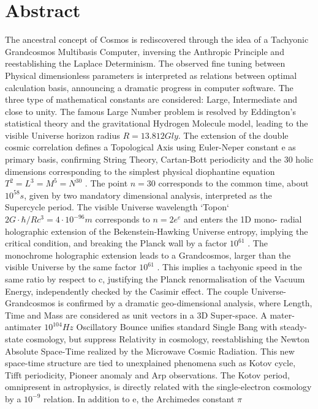
\chapter*{Abstract}
\vspace{-40pt}
The ancestral concept of Cosmos is rediscovered through the idea of a Tachyonic
Grandcosmos Multibasis Computer, inversing the Anthropic Principle and reestablishing
the Laplace Determinism. The observed fine tuning between Physical dimensionless
parameters is interpreted as relations between optimal calculation basis, announcing a
dramatic progress in computer software. The three type of mathematical constants are
considered: Large, Intermediate and close to unity. The famous Large Number problem is
resolved by Eddington's statistical theory and the gravitational Hydrogen Molecule model,
leading to the visible Universe horizon radius $ R = 13.812 Gly $. The extension of
the double cosmic correlation defines a Topological Axis using Euler-Neper constant e as
primary basis, confirming String Theory, Cartan-Bott periodicity and the 30 holic
dimensions corresponding to the simplest physical diophantine equation $T^2 = L^3 = M^5 =
N^{30}$ . The point $n = 30$ corresponds to the common time, about $10^{58} s$, given by two
mandatory dimensional analysis, interpreted as the Supercycle period. The visible Universe
wavelength `Topon` $2G \cdot \hbar / Rc^3 = 4 \cdot 10^{-96} m$ corresponds to $n = 2e^e$ and enters the 1D mono-
radial holographic extension of the Bekenstein-Hawking Universe entropy, implying the
critical condition, and breaking the Planck wall by a factor $10^{61}$ . The monochrome
holographic extension leads to a Grandcosmos, larger than the visible Universe by the
same factor $10^{61}$ . This implies a tachyonic speed in the same ratio by respect to c, justifying
the Planck renormalisation of the Vacuum Energy, independently checked by the Casimir
effect. The couple Universe-Grandcosmos is confirmed by a dramatic geo-dimensional
analysis, where Length, Time and Mass are considered as unit vectors in a 3D Super-space.
A mater-antimater $10^104 Hz$ Oscillatory Bounce unifies standard Single Bang with steady-
state cosmology, but suppress Relativity in cosmology, reestablishing the Newton Absolute
Space-Time realized by the Microwave Cosmic Radiation. This new space-time structure are
tied to unexplained phenomena such as Kotov cycle, Tifft periodicity, Pioneer anomaly and
Arp observations. The Kotov period, omnipresent in astrophysics, is directly related with the
single-electron cosmology by a $10^{-9}$ relation. In addition to e, the Archimedes constant $\pi$
